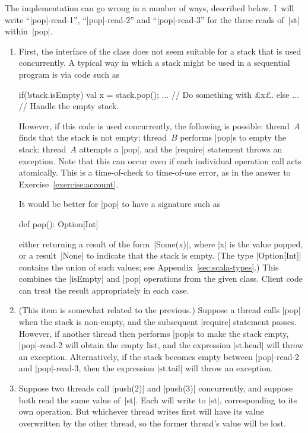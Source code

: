 \begin{answerS}
The implementation can go wrong in a number of ways, described below.  I~will
write ``|pop|-read-1'', ``|pop|-read-2'' and ``|pop|-read-3'' for the three
reads of~|st| within~|pop|.
%
\begin{enumerate}
\item First, the interface of the class does not seem suitable for a stack
  that is used concurrently.  A typical way in which a stack might be used in
  a sequential program is via code such as
\begin{scala}
  if(!stack.isEmpty){ 
    val x = stack.pop(); ... // Do something with £x£.
  }
  else ... // Handle the empty stack.
\end{scala}
However, if this code is used concurrently, the following is possible:
thread~$A$ finds that the stack is not empty; thread~$B$ performs |pop|s to
empty the stack; thread~$A$ attempts a |pop|, and the |require| statement
throws an exception.  Note that this can occur even if each individual
operation call acts atomically.  This is a time-of-check to time-of-use error,
as in the answer to Exercise~\ref{exercise:account}.

It would be better for |pop| to have a signature such as
\begin{scala}
  def pop(): Option[Int]
\end{scala}
either returning a result of the form~|Some(x)|, where |x| is the value
popped, or a result~|None| to indicate that the stack is empty.  (The type
|Option[Int]| contains the union of such values; see
Appendix~\ref{sec:scala-types}.)  This combines the |isEmpty| and |pop|
operations from the given class.  Client code can treat the result
appropriately in each case.

\item (This item is somewhat related to the previous.)  Suppose a thread calls
  |pop| when the stack is non-empty, and the subsequent |require| statement
  passes.  However, if another thread then performs |pop|s to make the stack
  empty, |pop|-read-2 will obtain the empty list, and the expression |st.head|
  will throw an exception.  Alternatively, if the stack becomes empty between
  |pop|-read-2 and |pop|-read-3, then the expression |st.tail| will throw an
  exception.

\item Suppose two threads call |push(2)| and |push(3)| concurrently, and
  suppose both read the same value of~|st|.  Each will write to |st|,
  corresponding to its own operation.  But whichever thread writes first will
  have its value overwritten by the other thread, so the former thread's value
  will be lost.


\end{enumerate}
\end{answerS}
